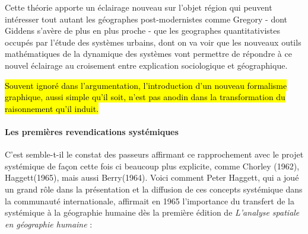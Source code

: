 
Cette théorie apporte un éclairage nouveau sur l'objet région qui peuvent intéresser tout autant les géographes post-modernistes comme Gregory - dont Giddens s'avère de plus en plus proche - que les geographes quantitativistes occupés par l'étude des systèmes urbains, dont on va voir que les nouveaux outils mathématiques de la dynamique des systèmes vont permettre de répondre à ce nouvel éclairage au croisement entre explication sociologique et géographique.



\hl{Souvent ignoré dans l'argumentation, l'introduction d'un nouveau formalisme graphique, aussi simple qu'il soit, n'est pas anodin dans la transformation du raisonnement qu'il induit.}


\paragraph{Les premières revendications systémiques}

C'est semble-t-il le constat des passeurs affirmant ce rapprochement avec le projet systémique de façon cette fois ci beaucoup plus explicite, comme Chorley (1962), Haggett(1965), mais aussi Berry(1964). Voici comment Peter Haggett, qui a joué un grand rôle dans la présentation et la diffusion de ces concepts systémique dans la communauté internationale, affirmait en 1965 l'importance du transfert de la systémique à la géographie humaine dès la première édition de \textit{L’analyse spatiale en géographie humaine} : 

